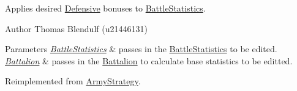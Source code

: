 Applies desired \mbox{\hyperlink{class_defensive}{Defensive}} bonuses to \mbox{\hyperlink{class_battle_statistics}{Battle\+Statistics}}. 

\begin{DoxyAuthor}{Author}
Thomas Blendulf (u21446131) 
\end{DoxyAuthor}

\begin{DoxyParams}{Parameters}
{\em \mbox{\hyperlink{class_battle_statistics}{Battle\+Statistics}}} & passes in the \mbox{\hyperlink{class_battle_statistics}{Battle\+Statistics}} to be edited. \\
\hline
{\em \mbox{\hyperlink{class_battalion}{Battalion}}} & passes in the \mbox{\hyperlink{class_battalion}{Battalion}} to calculate base statistics to be editted. \\
\hline
\end{DoxyParams}


Reimplemented from \mbox{\hyperlink{class_army_strategy_ade28f2b5107c9fcdc58e73e1053e6cff}{Army\+Strategy}}.

